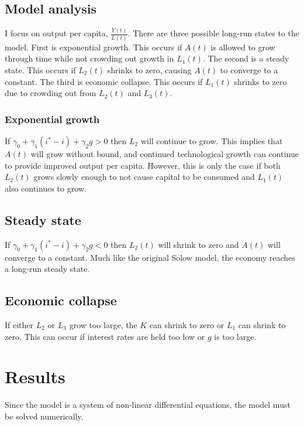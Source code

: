 \documentclass[12pt]{article}
\theoremstyle{definition}
\begin{document}
\subsection{Model analysis}

I focus on output per capita, \(\frac{Y(t)}{L(t)}\). There are three possible long-run states to the model.  First is exponential growth.  This occurs if \(A(t)\) is allowed to grow through time while not crowding out growth in \(L_1(t)\).  The second is a steady state.  This occurs if \(L_2(t)\) shrinks to zero, causing \(A(t)\) to converge to a constant.  The third is economic collapse.  This occurs if \(L_1(t)\) shrinks to zero due to crowding out from \(L_2(t)\) and \(L_3(t)\).  

\subsubsection{Exponential growth}
If \(\gamma_0+\gamma_1 (i^*-i)+\gamma_2 g > 0\) then \(L_2\) will continue to grow.  This implies that \(A(t)\) will grow without bound, and continued technological growth can continue to provide improved output per capita.  However, this is only the case if both \(L_2(t)\) grows slowly enough to not cause capital to be consumed and \(L_1(t)\) also continues to grow.  

\subsection{Steady state}
If \(\gamma_0+\gamma_1 (i^*-i)+\gamma_2 g <0\) then \(L_2(t)\) will shrink to zero and \(A(t)\) will converge to a constant.  Much like the original Solow model, the economy reaches a long-run steady state.  

\subsection{Economic collapse}
If either \(L_2\) or \(L_3\) grow too large, the \(K\) can shrink to zero or \(L_1\) can shrink to zero.  This can occur if interest rates are held too low or \(g\) is too large.  

\section{Results}

Since the model is a system of non-linear differential equations, the model must be solved numerically.  
\end{document}
